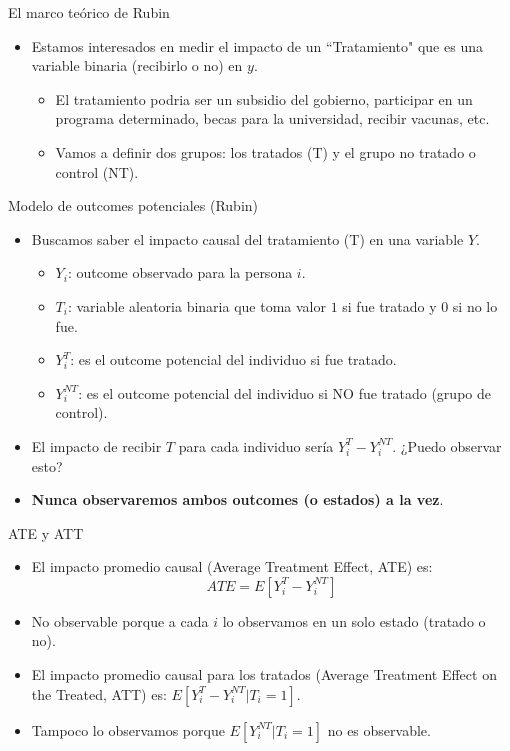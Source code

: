 \documentclass[10pt]{beamer}
\begin{document}
\begin{frame}{El marco teórico de Rubin}
    \begin{itemize}
        \item  Estamos interesados en medir el impacto de un ``Tratamiento" que es una variable binaria (recibirlo o no) en $y$.
        \begin{itemize}
            \item  El tratamiento podria ser un subsidio del gobierno, participar en un programa determinado, becas para la universidad, recibir vacunas, etc.
            \item Vamos a definir dos grupos: los tratados (T) y el grupo no tratado o control (NT).
        \end{itemize}
    \end{itemize}
\end{frame}

\begin{frame}{Modelo de outcomes potenciales (Rubin)}
    \begin{itemize}
        \item Buscamos saber el impacto causal del tratamiento (T) en una variable $Y$.
        \begin{itemize}
            \item $Y_i$: outcome observado para la persona $i$.
            \item $T_i$: variable aleatoria binaria que toma valor $1$ si fue tratado y $0$ si no lo fue.
            \item $Y_i^T$: es el outcome potencial del individuo si fue tratado.
            \item $Y_i^{NT}$: es el outcome potencial del individuo si NO fue tratado (grupo de control).
        \end{itemize}

        \item El impacto de recibir $T$ para cada individuo sería $Y_i^T - Y_i^{NT}$. ¿Puedo observar esto?
        \item \textbf{Nunca observaremos ambos outcomes (o estados) a la vez}.
    \end{itemize}
\end{frame}
\begin{frame}{ATE y ATT}
\begin{itemize}
    \item El impacto promedio causal (Average Treatment Effect, ATE) es:
        $$ATE = E[Y_i^T - Y_i^{NT}]$$
    \item {\color{blue}No observable }porque a cada $i$ lo observamos en un solo estado (tratado o no).
    \item El impacto promedio causal para los tratados (Average Treatment Effect on the Treated, ATT) es: 
    $E[Y_i^T - Y_i^{NT} | T_i=1]$. \item {\color{blue}Tampoco lo observamos porque $E[Y_i^{NT}|T_i=1]$ no es observable.}
\end{itemize}
\end{frame}
\end{document}
